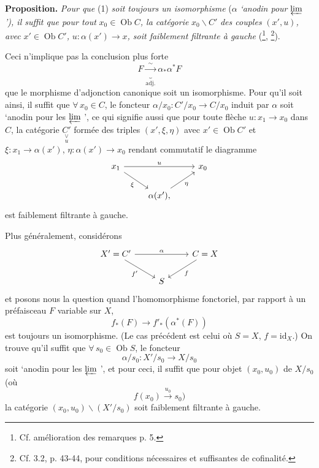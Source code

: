 \documentclass[11pt]{article}
\newcommand{\printedpage}[1]{\marginpar{\footnotesize p.~#1}}
\newcommand{\msp}[1]{\marginpar{\footnotesize [#1]}}
\newcommand{\Vcat}[2]{\underset{#2}{\underset{\vee}{#1}}}
\begin{document}
\textbf{Proposition.} \textit{Pour que} (1) \textit{soit toujours un isomorphisme} ($\alpha$ \textit{`anodin pour} $\varprojlim$ \textit{'), il suffit que pour tout} $x_0 \in \operatorname{Ob} C$\textit{, la catégorie} $x_0\backslash C'$ \textit{des couples} $(x', u)$\textit{, avec} $x' \in \operatorname{Ob} C'$\textit{,} $u : \alpha(x') \longrightarrow x$\textit{, soit faiblement filtrante à gauche} (\footnote{Cf. amélioration des remarques p. 5.}, \footnote{Cf. 3.2, p. 43-44, pour conditions nécessaires et suffisantes de cofinalité.}). %

Ceci n'implique pas la conclusion plus forte
\[ F \underbrace{\xrightarrow{\;\sim\;}}_{\text{adj.}} \alpha_*\alpha^* F \]
que le morphisme d'adjonction canonique soit un isomorphisme. Pour qu'il soit ainsi, il suffit que $\forall\, x_0 \in C$, le foncteur $\alpha/x_0 : C'/x_0 \longrightarrow C/x_0$ induit par $\alpha$ soit `anodin pour les $\varprojlim$ ', ce qui signifie aussi que pour toute flèche $u : x_1 \longrightarrow x_0$ dans $C$, la catégorie $\Vcat{C'}{u}$ formée des triples $(x', \xi, \eta)$ avec $x' \in \operatorname{Ob} C'$ et $\xi : x_1 \longrightarrow \alpha(x')$, $\eta : \alpha(x') \longrightarrow x_0$ rendant commutatif
\msp{page 2}
le diagramme
\printedpage{2}
\[
\begin{tikzcd}
x_1 \arrow[rr, "u"] \arrow[dr, "\xi"'] & & x_0 \\
 & \alpha(x'), \arrow[ur, "\eta"'] &
\end{tikzcd}
\]
est faiblement filtrante à gauche.

Plus généralement, considérons
\[
\begin{tikzcd}
X' = C' \arrow[rr, "\alpha"] \arrow[dr, "f'"'] & & C = X \arrow[dl, "f"] \\
 & S &
\end{tikzcd}
\]
et posons nous la question quand l'homomorphisme fonctoriel, par rapport à un préfaisceau $F$ variable sur $X$,
\[ f_*(F) \longrightarrow f'_*(\alpha^*(F)) \]
est toujours un isomorphisme. (Le cas précédent est celui où $S = X$, $f = \mathrm{id}_X$.) On trouve qu'il suffit que $\forall\, s_0 \in \operatorname{Ob} S$, le foncteur
\[ \alpha/s_0 : X'/s_0 \longrightarrow X/s_0 \]
soit `anodin pour les $\varprojlim$ ', et pour ceci, il suffit que pour objet $(x_0, u_0)$ de $X/s_0$ (où
\[ f(x_0) \xrightarrow{u_0} s_0) \]
la catégorie $(x_0, u_0)\backslash(X'/s_0)$ soit faiblement filtrante à gauche.
\end{document}
